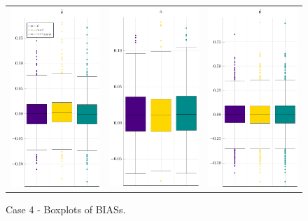 \begin{figure}[ht]
	
	\centering
	\begin{tabular}[b]{c c c}
		\includegraphics[width=.3\textwidth]{Figures/4/BIAS_b.pdf} & \includegraphics[width=.3\textwidth]{Figures/4/BIAS_a.pdf} & \includegraphics[width=.3\textwidth]{Figures/4/BIAS_t.pdf}
	\end{tabular}
	\caption{Case 4 - Boxplots of BIASs.}
	\label{fig:bpBIAS4}
\end{figure}
